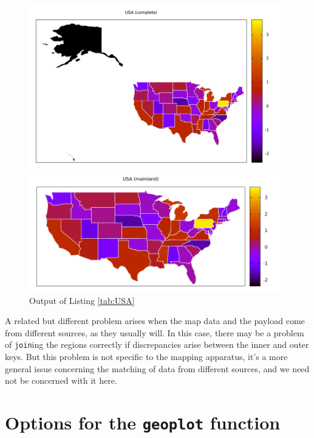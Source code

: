 \documentclass{article}
\begin{document}
\begin{figure}[p]
  \begin{center}
  \includegraphics[scale=0.9]{us0.pdf}

  \includegraphics[scale=0.9]{us1.pdf}
\end{center}
\caption{Output of Listing \ref{tab:USA}}
\label{fig:USA}
\end{figure}

A related but different problem arises when the map data and the
payload come from different sources, as they usually will. In this
case, there may be a problem of \texttt{join}ing the regions correctly
if discrepancies arise between the inner and outer keys. But this
problem is not specific to the mapping apparatus, it's a more general
issue concerning the matching of data from different sources, and we
need not be concerned with it here.

\section{Options for the \texttt{geoplot} function}
\label{sec:opts}
\end{document}
